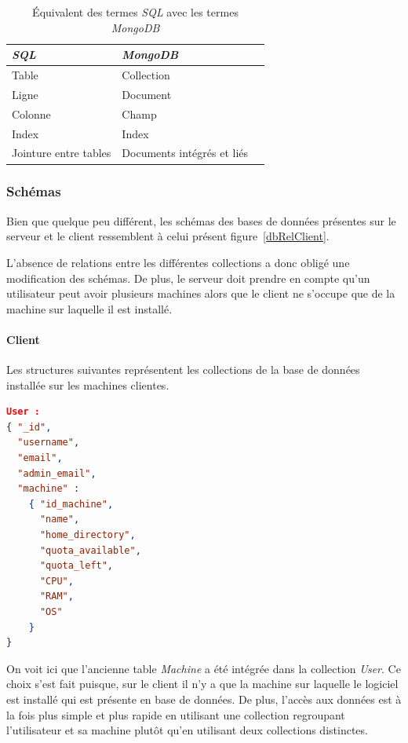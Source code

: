 \documentclass[a4paper,10pt, twoside]{report}
\begin{document}
\begin{spacing}{1.2}
\begin{table}[h!]
  \centering
  \def\arraystretch{1.5}
  \setlength{\fboxsep}{13pt} %
  \setlength{\fboxrule}{0pt} %
  \begin{tabular}{lm{6cm}m{6cm}}
   \rowcolor{arkred} 
    \arrayrulecolor{gray73}\hline
    \color{white} \textbf{\textit{SQL}} &
    \color{white} \textbf{\textit{MongoDB}}\\
    \hline
    Table & Collection\\
    \hline
    Ligne & Document\\
    \hline
    Colonne & Champ\\
    \hline
    Index & Index\\
    \hline
    Jointure entre tables & Documents intégrés et liés
  \end{tabular}
  \caption{\label{tabMappSQLMongoTerms} Équivalent des termes \textit{SQL}
  avec les termes \textit{MongoDB}}
\end{table}

\subsubsection{Schémas}
Bien que quelque peu différent, les schémas des bases de données
présentes sur le serveur et le client ressemblent à celui présent
figure~\ref{dbRelClient}.

L'absence de relations entre les différentes collections a donc obligé une
modification des schémas. De plus, le serveur doit prendre en compte qu'un
utilisateur peut avoir plusieurs machines alors que le client ne s'occupe que
de la machine sur laquelle il est installé.

\paragraph{Client\\}
Les structures suivantes représentent les collections de la base de données
installée sur les machines clientes.

\begin{lstlisting}[language=json]
User :
{ "_id",
  "username",
  "email",
  "admin_email",
  "machine" :
    { "id_machine",
      "name",
      "home_directory",
      "quota_available",
      "quota_left",
      "CPU",
      "RAM",
      "OS"
    }
}
\end{lstlisting}

On voit ici que l'ancienne table \textit{Machine} a été intégrée dans
la collection \textit{User}. Ce choix s'est fait puisque, sur le client
il n'y a que la machine sur laquelle le logiciel est installé qui est
présente en base de données. De plus, l'accès aux données est à la
fois plus simple et plus rapide en utilisant une collection regroupant
l'utilisateur et sa machine plutôt qu'en utilisant deux collections
distinctes.


\end{spacing}
\end{document}
